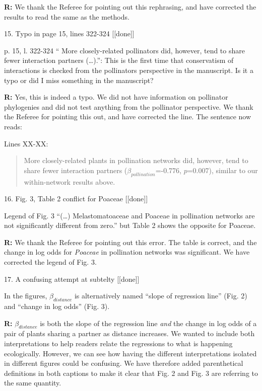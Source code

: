 \documentclass[12pt]{letter}
\newenvironment{refquote}{\bigskip \begin{it}}{\end{it}\smallskip}
\begin{document}
	\textbf{R:} We thank the Referee for pointing out this rephrasing, and have corrected the results to read the same as the methods.


15. Typo in page 15, lines 322-324 [[done]]

	\begin{refquote}
		p. 15, l. 322-324 “ More closely-related pollinators did, however, tend to share fewer interaction partners (…).”: This is the first time that conservatism of interactions is checked from the pollinators perspective in the manuscript. Is it a typo or did I miss something in the manuscript?
	\end{refquote}


	\textbf{R:} Yes, this is indeed a typo. We did not have information on pollinator phylogenies and did not test anything from the pollinator perspective. We thank the Referee for pointing this out, and have corrected the line. The sentence now reads:

	Lines XX-XX:
	\begin{quotation}
		More closely-related plants in pollination networks did, however, tend to share fewer interaction partners ($\beta_{pollination}$=-0.776, $p$=0.007), similar to our within-network results above.
	\end{quotation}


16. Fig. 3, Table 2 conflict for Poaceae [[done]]

	\begin{refquote}
		Legend of Fig. 3 “(…) Melastomatoaceae and Poaceae in pollination networks are not significantly different from zero.” but Table 2 shows the opposite for Poaceae.
	\end{refquote}

	\textbf{R:} We thank the Referee for pointing out this error. The table is correct, and the change in log odds for \emph{Poaceae} in pollination networks was significant. We have corrected the legend of Fig. 3.


17. A confusing attempt at subtelty [[done]]

	\begin{refquote}
		In the figures, $\beta_{distance}$ is alternatively named “slope of regression line” (Fig. 2) and “change in log odds” (Fig. 3).
	\end{refquote}


	\textbf{R:} $\beta_{distance}$ is both the slope of the regression line \emph{and} the change in log odds of a pair of plants sharing a partner as distance increases. We wanted to include both interpretations to help readers relate the regressions to what is happening ecologically. However, we can see how having the different interpretations isolated in different figures could be confusing. We have therefore added parenthetical definitions in both captions to make it clear that Fig. 2 and Fig. 3 are referring to the same quantity.
\end{document}
